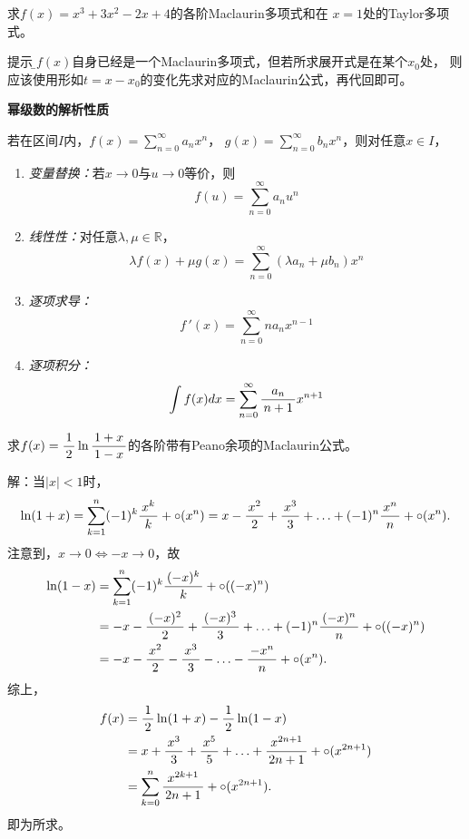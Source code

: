 \egz 求$f(x)=x^3+3x^2-2x+4$的各阶Maclaurin多项式和在
$x=1$处的Taylor多项式。

提示：{\b$f(x)$自身已经是一个Maclaurin多项式，但若所求展开式是在某个$x_0$处，
则应该使用形如$t=x-x_0$的变化先求对应的Maclaurin公式，再代回即可。}


\begin{thx}
	{\bf 幂级数的解析性质}
	
	若在区间$I$内，$f(x)=\sum\limits_{n=0}^{\infty}a_nx^n$，
	$g(x)=\sum\limits_{n=0}^{\infty}b_nx^n$，则对任意$x\in I$，
	\begin{enumerate}[(1)]
	  \item {\it 变量替换：}若$x\to 0$与$u\to 0$等价，则
	  $$f(u)=\sum\limits_{n=0}^{\infty}a_nu^n$$
	  \item {\it 线性性：}对任意$\lambda,\mu\in\mathbb{R}$，
	  $$\lambda f(x)+\mu g(x)=\sum\limits_{n=0}^{\infty}(\lambda a_n+\mu
	  b_n)x^n$$ 
	  \item {\it 逐项求导：}
	  $$f\,'(x)=\sum\limits_{n=0}^{\infty}na_{n}x^{n-1}$$ 
	  \item {\it 逐项积分：} 
	  $$\displaystyle\int f(x)dx=\sum\limits_{n=0}^{\infty}
	  \displaystyle\frac{\,{a_{n}}\,}{\,{n+1}\,}x^{n+1}$$
	\end{enumerate}
\end{thx}


\egz 求$f(x)=\displaystyle\frac{\,{1}\,}{\,{2}\,}\ln\displaystyle\frac{\,{1+x}\,}{\,{1-x}\,}$的各阶带有Peano余项的Maclaurin公式。

解：当$|x|<1$时，
$$\ln(1+x)=\sum\limits_{k=1}^n(-1)^k\displaystyle\frac{\,{x^k}\,}{\,{k}\,}+\circ(x^n)
=x-\displaystyle\frac{\,{x^2}\,}{\,{2}\,}+\displaystyle\frac{\,{x^3}\,}{\,{3}\,}+\ldots+(-1)^n\displaystyle\frac{\,{x^n}\,}{\,{n}\,}+\circ(x^n).$$
注意到，$x\to0\Leftrightarrow-x\to 0$，故
\begin{align*}
	\ln(1-x)&=\sum\limits_{k=1}^n(-1)^k\displaystyle\frac{\,{(-x)^k}\,}{\,{k}\,}+\circ((-x)^n)\\
	&=-x-\displaystyle\frac{\,{(-x)^2}\,}{\,{2}\,}+\displaystyle\frac{\,{(-x)^3}\,}{\,{3}\,}+\ldots+(-1)^n\displaystyle\frac{\,{(-x)^n}\,}{\,{n}\,}+\circ((-x)^n)\\
	&=-x-\displaystyle\frac{\,{x^2}\,}{\,{2}\,}-\displaystyle\frac{\,{x^3}\,}{\,{3}\,}-\ldots-\displaystyle\frac{\,{-x^n}\,}{\,{n}\,}+\circ(x^n).
\end{align*}
综上，
\begin{align*}
	f(x)&=\displaystyle\frac{\,{1}\,}{\,{2}\,}\ln(1+x)-\displaystyle\frac{\,{1}\,}{\,{2}\,}\ln(1-x)\\
	&=x+\displaystyle\frac{\,{x^3}\,}{\,{3}\,}+\displaystyle\frac{\,{x^5}\,}{\,{5}\,}+\ldots+\displaystyle\frac{\,{x^{2n+1}}\,}{\,{2n+1}\,}+\circ(x^{2n+1})\\
	&=\sum\limits_{k=0}^n\displaystyle\frac{\,{x^{2k+1}}\,}{\,{2n+1}\,}+\circ(x^{2n+1}).
\end{align*}
即为所求。\fin

